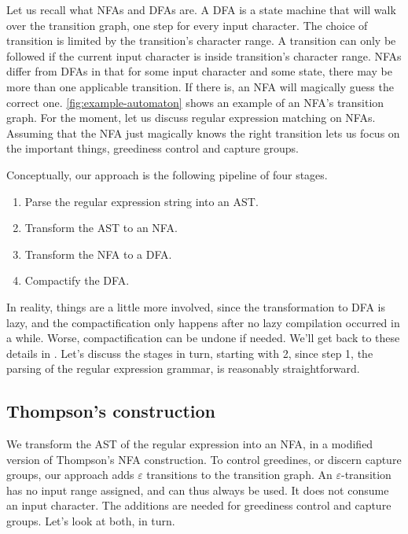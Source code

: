 \documentclass[english]{sigplanconf}
\theoremstyle{definition}
\begin{document}
Let us recall what NFAs and DFAs are. A DFA is a state machine that
will walk over the transition graph, one step for every input
character. The choice of transition is limited by the transition's
character range. A transition can only be followed if the current
input character is inside transition's character range. NFAs differ
from DFAs in that for some input character and some state, there
may be more than one applicable transition. If there is, an
NFA will magically guess the correct one. \autoref{fig:example-automaton}
shows an example of an NFA's transition graph. For the moment, let
us discuss regular expression matching on NFAs. Assuming that the
NFA just magically knows the right transition lets us focus on the
important things, greediness control and capture groups.

Conceptually, our approach is the following pipeline of four stages.
\begin{enumerate}
  \item Parse the regular expression string into an AST.
  \item Transform the AST to an NFA.
  \item Transform the NFA to a DFA.
  \item Compactify the DFA.
\end{enumerate}

In reality, things are a little more involved, since the transformation
to DFA is lazy, and the compactification only happens after no lazy
compilation occurred in a while. Worse, compactification can be
undone if needed. We'll get back to these details in .
Let's discuss the stages in turn, starting with 2, since step 1,
the parsing of the regular expression grammar, is reasonably
straightforward.

\subsection{Thompson's construction} 

We transform the AST of the regular expression into an NFA,
in a modified version of Thompson's NFA construction. To
control greedines, or discern capture groups, our approach adds
$\varepsilon$ transitions to the transition graph. An
$\varepsilon$-transition has no input range assigned, and can thus always
be used. It does not consume an input character.
The additions are needed for greediness control and capture groups.
Let's look at both, in turn.
\end{document}
